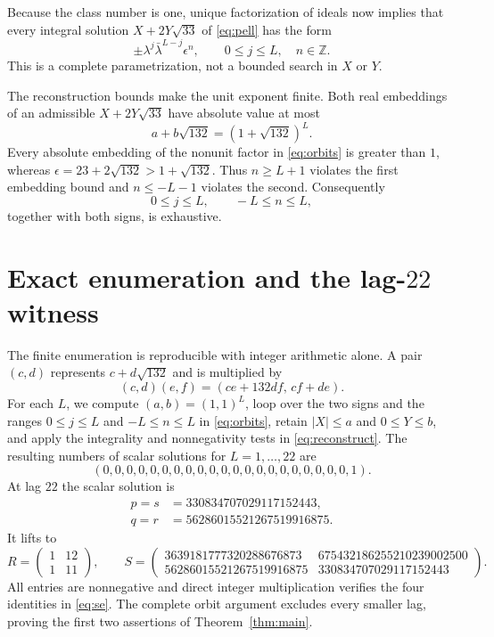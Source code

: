 \documentclass[11pt]{article}
\begin{document}
Because the class number is one, unique factorization of ideals now implies
that every integral solution
$X+2Y\sqrt{33}$ of \eqref{eq:pell} has the form
\begin{equation}\label{eq:orbits}
\pm\lambda^j\bar\lambda^{L-j}\epsilon^n,\qquad
0\leq j\leq L,\quad n\in\mathbb Z.
\end{equation}
This is a complete parametrization, not a bounded search in $X$ or $Y$.

The reconstruction bounds make the unit exponent finite.  Both real
embeddings of an admissible $X+2Y\sqrt{33}$ have absolute value at most
\[
a+b\sqrt{132}=(1+\sqrt{132})^L.
\]
Every absolute embedding of the nonunit factor in \eqref{eq:orbits} is
greater than $1$, whereas
$\epsilon=23+2\sqrt{132}>1+\sqrt{132}$.  Thus $n\geq L+1$ violates the
first embedding bound and $n\leq-L-1$ violates the second.  Consequently
\begin{equation}\label{eq:finite}
0\leq j\leq L,\qquad -L\leq n\leq L,
\end{equation}
together with both signs, is exhaustive.

\section{Exact enumeration and the lag-\texorpdfstring{$22$}{22} witness}

The finite enumeration is reproducible with integer arithmetic alone.  A pair
$(c,d)$ represents $c+d\sqrt{132}$ and is multiplied by
\[
(c,d)(e,f)=(ce+132df,\,cf+de).
\]
For each $L$, we compute $(a,b)=(1,1)^L$, loop over the two signs and the
ranges $0\leq j\leq L$ and $-L\leq n\leq L$ in
\eqref{eq:orbits}, retain $|X|\leq a$ and $0\leq Y\leq b$, and apply the
integrality and nonnegativity tests in \eqref{eq:reconstruct}.  The resulting
numbers of scalar solutions for $L=1,\ldots,22$ are
\[
(0,0,0,0,0,0,0,0,0,0,0,0,0,0,0,0,0,0,0,0,0,1).
\]
At lag $22$ the scalar solution is
\begin{align*}
p=s&=330834707029117152443,\\
q=r&=56286015521267519916875.
\end{align*}
It lifts to
\[
R=\begin{pmatrix}1&12\\1&11\end{pmatrix},\qquad
S=\begin{pmatrix}
3639181777320288676873&675432186255210239002500\\
56286015521267519916875&330834707029117152443
\end{pmatrix}.
\]
All entries are nonnegative and direct integer multiplication verifies the
four identities in \eqref{eq:se}.  The complete orbit argument excludes every
smaller lag, proving the first two assertions of Theorem~\ref{thm:main}.
\end{document}
